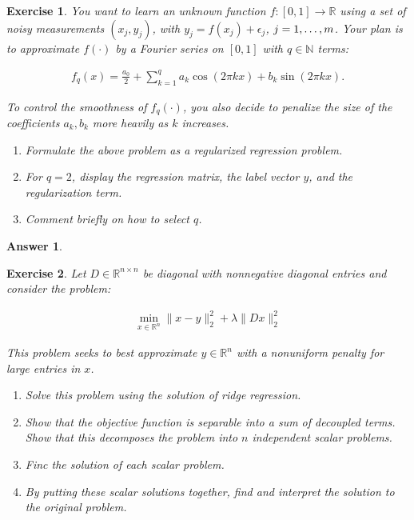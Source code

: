 \documentclass[12pt]{article}
\theoremstyle{colon}
\newtheorem{exercise}{Exercise}
\newtheorem*{answer}{Answer}
\begin{document}
\clearpage

\begin{exercise}
  You want to learn an unknown function $f: [0,1] \rightarrow \mathbb{R}$ using a set of noisy measurements $(x_j, y_j)$, with $y_j = f(x_j) + \epsilon_j$, $j = 1, \mathellipsis, m$. Your plan is to approximate $f(\cdot)$ by a Fourier series on $[0,1]$ with $q \in \mathbb{N}$ terms:

  \begin{gather*}
    f_q(x) = \frac{a_0}{2} + \sum_{k=1}^q a_k \cos(2 \pi k x) + b_k \sin(2 \pi k x).
  \end{gather*}

  To control the smoothness of $f_q(\cdot)$, you also decide to penalize the size of the coefficients $a_k, b_k$ more heavily as $k$ increases.

  \begin{enumerate}[label=\alph*)]
    \item Formulate the above problem as a regularized regression problem.
    \item For $q=2$, display the regression matrix, the label vector $y$, and the regularization term.
    \item Comment briefly on how to select $q$.
  \end{enumerate}
\end{exercise}

\begin{answer}
  
\end{answer}

\clearpage

\begin{exercise}
  Let $D \in \mathbb{R}^{n \times n}$ be diagonal with nonnegative diagonal entries and consider the problem:

  \begin{gather*}
    \min_{x \in \mathbb{R}^n} \lVert x - y \rVert_2^2 + \lambda \lVert D x \rVert_2^2
  \end{gather*}

  This problem seeks to best approximate $y \in \mathbb{R}^n$ with a nonuniform penalty for large entries in $x$.

  \begin{enumerate}[label=\alph*)]
    \item Solve this problem using the solution of ridge regression.
    \item Show that the objective function is separable into a sum of decoupled terms. Show that this decomposes the problem into $n$ independent scalar problems.
    \item Finc the solution of each scalar problem.
    \item By putting these scalar solutions together, find and interpret the solution to the original problem.
  \end{enumerate}
\end{exercise}
\end{document}
